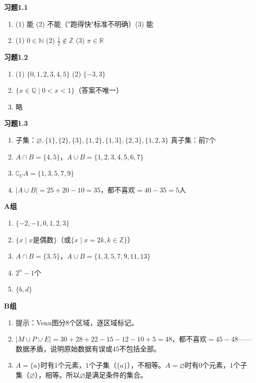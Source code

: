

\textbf{习题1.1}
\begin{enumerate}
\item (1) 能 \qquad (2) 不能（"跑得快"标准不明确）\qquad (3) 能
\item (1) $0\in\mathbb N$ \qquad (2) $\frac12\notin\mathbb Z$ \qquad (3) $\pi\in\mathbb R$
\end{enumerate}

\textbf{习题1.2}
\begin{enumerate}
\item (1) $\{0,1,2,3,4,5\}$ \qquad (2) $\{-3,3\}$
\item $\{x\in\mathbb Q\mid 0<x<1\}$（答案不唯一）
\item 略
\end{enumerate}

\textbf{习题1.3}
\begin{enumerate}
\item 子集：$\varnothing,\{1\},\{2\},\{3\},\{1,2\},\{1,3\},\{2,3\},\{1,2,3\}$ \qquad 真子集：前$7$个
\item $A\cap B=\{4,5\}$，$A\cup B=\{1,2,3,4,5,6,7\}$
\item $\complement_UA=\{1,3,5,7,9\}$
\item $|A\cup B|=25+20-10=35$，都不喜欢$=40-35=5$人
\end{enumerate}

\textbf{A组}
\begin{enumerate}
\item $\{-2,-1,0,1,2,3\}$
\item $\{x\mid x\text{是偶数}\}$（或$\{x\mid x=2k,k\in\mathbb Z\}$）
\item $A\cap B=\{3,5\}$，$A\cup B=\{1,3,5,7,9,11,13\}$
\item $2^n-1$个
\item $\{b,d\}$
\end{enumerate}

\textbf{B组}
\begin{enumerate}
\item 提示：Venn图分$8$个区域，逐区域标记。
\item $|M\cup P\cup E|=30+28+22-15-12-10+5=48$，都不喜欢$=45-48$——数据矛盾，说明原始数据有误或$45$不包括全部。
\item $A=\{a\}$时有$1$个元素，$1$个子集（$\{a\}$），不相等。$A=\varnothing$时有$0$个元素，$1$个子集（$\varnothing$），相等。所以$\varnothing$是满足条件的集合。
\end{enumerate}

